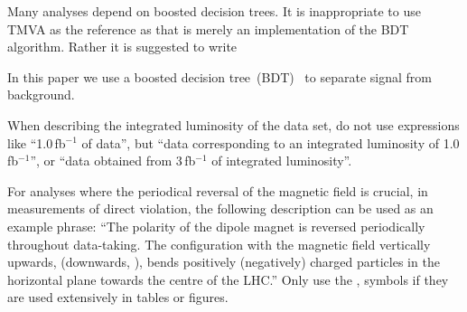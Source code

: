 Many analyses depend on boosted decision trees. It is inappropriate to
use TMVA as the reference as that is merely an implementation of the
BDT algorithm. Rather it is suggested to write

In this paper we use a boosted decision tree~(BDT)~\cite{Breiman,AdaBoost} to
separate signal from background.

When describing the integrated luminosity of the data set, do not use
expressions like ``1.0\,fb$^{-1}$ of data'', but \eg 
``data corresponding to an integrated luminosity of 1.0\,fb$^{-1}$'', 
or ``data obtained from 3\,fb$^{-1}$ of integrated luminosity''. 

For analyses where the periodical reversal of the magnetic field is crucial, 
\eg in measurements of direct \CP violation, the following description can be
used as an example phrase: 
``The polarity of the dipole magnet is reversed periodically throughout data-taking.
The configuration with the magnetic field vertically upwards, \MagUp (downwards, \MagDown), bends positively (negatively)
charged particles in the horizontal plane towards the centre of the LHC.''
Only use the \MagUp, \MagDown symbols if they are used extensively in tables or figures.
